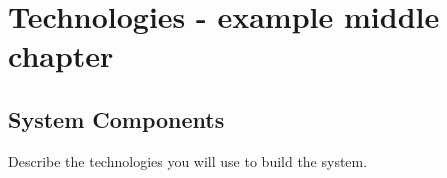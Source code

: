 \chapter{Technologies - example middle chapter}

\section{System Components}
Describe the technologies you will use to build the system.
